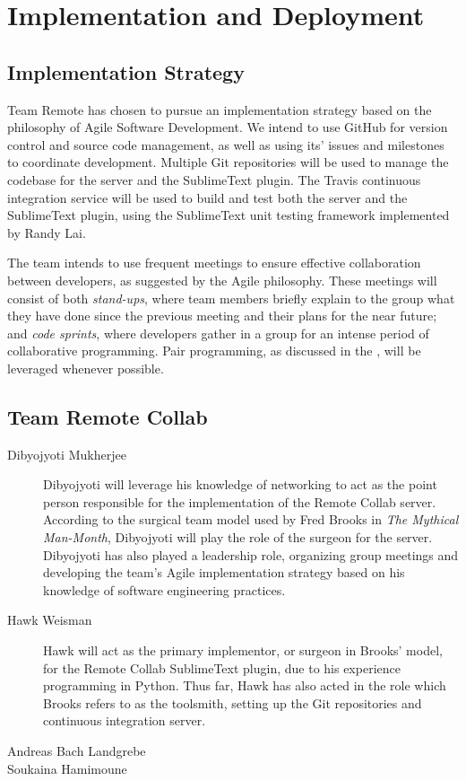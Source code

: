 \documentclass[11pt,english]{article}
\begin{document}
\section{Implementation and Deployment}
	\subsection{Implementation Strategy}
		Team Remote has chosen to pursue an implementation strategy based on the philosophy of Agile Software Development. We intend to use GitHub\cite{github} for version control and source code management, as well as using its' issues and milestones to coordinate development. Multiple Git repositories will be used to manage the codebase for the server and the SublimeText plugin. The Travis continuous integration service\cite{travis-ci} will be used to build and test both the server and the SublimeText plugin, using the SublimeText unit testing framework\cite{unittest} implemented by Randy Lai.

		The team intends to use frequent meetings to ensure effective collaboration between developers, as suggested by the Agile philosophy. These meetings will consist of both \textit{stand-ups}, where team members briefly explain to the group what they have done since the previous meeting and their plans for the near future; and \textit{code sprints}, where developers gather in a group for an intense period of collaborative programming. Pair programming, as discussed in the , will be leveraged whenever possible.
	\subsection{Team Remote Collab}
		\begin{description}
			\item[Dibyojyoti Mukherjee]{Dibyojyoti will leverage his knowledge of networking to act as the point person responsible for the implementation of the Remote Collab server. According to the surgical team model used by Fred Brooks in \textit{The Mythical Man-Month}\cite{mythical}, Dibyojyoti will play the role of the surgeon for the server. Dibyojyoti has also played a leadership role, organizing group meetings and developing the team's Agile implementation strategy based on his knowledge of software engineering practices.}
			\item[Hawk Weisman]{Hawk will act as the primary implementor, or surgeon in Brooks' model\cite{mythical}, for the Remote Collab SublimeText plugin, due to his experience programming in Python. Thus far, Hawk has also acted in the role which Brooks refers to as the toolsmith\cite{mythical}, setting up the Git repositories and continuous integration server.}
			\item[Andreas Bach Landgrebe]{}
			\item[Soukaina Hamimoune]{}
		\end{description}
\end{document}
